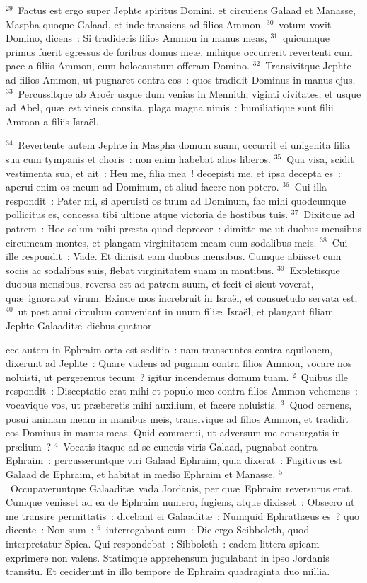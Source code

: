 ${}^{29}$~Factus est ergo super Jephte spiritus Domini, et circuiens Galaad et Manasse, Maspha quoque Galaad, et inde transiens ad filios Ammon,
${}^{30}$~votum vovit Domino, dicens~: Si tradideris filios Ammon in manus meas,
${}^{31}$~quicumque primus fuerit egressus de foribus domus me\ae , mihique occurrerit revertenti cum pace a filiis Ammon, eum holocaustum offeram Domino.
${}^{32}$~Transivitque Jephte ad filios Ammon, ut pugnaret contra eos~: quos tradidit Dominus in manus ejus.
${}^{33}$~Percussitque ab Aro\"er usque dum venias in Mennith, viginti civitates, et usque ad Abel, qu\ae\ est vineis consita, plaga magna nimis~: humiliatique sunt filii Ammon a filiis Isra\"el.


${}^{34}$~Revertente autem Jephte in Maspha domum suam, occurrit ei unigenita filia sua cum tympanis et choris~: non enim habebat alios liberos.
${}^{35}$~Qua visa, scidit vestimenta sua, et ait~: Heu me, filia mea~! decepisti me, et ipsa decepta es~: aperui enim os meum ad Dominum, et aliud facere non potero.
${}^{36}$~Cui illa respondit~: Pater mi, si aperuisti os tuum ad Dominum, fac mihi quodcumque pollicitus es, concessa tibi ultione atque victoria de hostibus tuis.
${}^{37}$~Dixitque ad patrem~: Hoc solum mihi pr\ae sta quod deprecor~: dimitte me ut duobus mensibus circumeam montes, et plangam virginitatem meam cum sodalibus meis.
${}^{38}$~Cui ille respondit~: Vade. Et dimisit eam duobus mensibus. Cumque abiisset cum sociis ac sodalibus suis, flebat virginitatem suam in montibus.
${}^{39}$~Expletisque duobus mensibus, reversa est ad patrem suum, et fecit ei sicut voverat, qu\ae\ ignorabat virum. Exinde mos increbruit in Isra\"el, et consuetudo servata est,
${}^{40}$~ut post anni circulum conveniant in unum fili\ae\ Isra\"el, et plangant filiam Jephte Galaadit\ae\ diebus quatuor.

\bchapter
{}cce autem in Ephraim orta est seditio~: nam transeuntes contra aquilonem, dixerunt ad Jephte~: Quare vadens ad pugnam contra filios Ammon, vocare nos noluisti, ut pergeremus tecum~? igitur incendemus domum tuam.
${}^{2}$~Quibus ille respondit~: Disceptatio erat mihi et populo meo contra filios Ammon vehemens~: vocavique vos, ut pr\ae beretis mihi auxilium, et facere noluistis.
${}^{3}$~Quod cernens, posui animam meam in manibus meis, transivique ad filios Ammon, et tradidit eos Dominus in manus meas. Quid commerui, ut adversum me consurgatis in pr\ae lium~?
${}^{4}$~Vocatis itaque ad se cunctis viris Galaad, pugnabat contra Ephraim~: percusseruntque viri Galaad Ephraim, quia dixerat~: Fugitivus est Galaad de Ephraim, et habitat in medio Ephraim et Manasse.
${}^{5}$~Occupaveruntque Galaadit\ae\ vada Jordanis, per qu\ae\ Ephraim reversurus erat. Cumque venisset ad ea de Ephraim numero, fugiens, atque dixisset~: Obsecro ut me transire permittatis~: dicebant ei Galaadit\ae~: Numquid Ephrath\ae us es~? quo dicente~: Non sum~:
${}^{6}$~interrogabant eum~: Dic ergo Scibboleth, quod interpretatur Spica. Qui respondebat~: Sibboleth~: eadem littera spicam exprimere non valens. Statimque apprehensum jugulabant in ipso Jordanis transitu. Et ceciderunt in illo tempore de Ephraim quadraginta duo millia.


